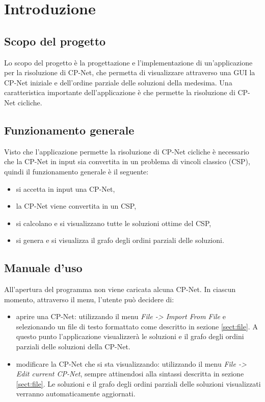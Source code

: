 \section{Introduzione}


\subsection{Scopo del progetto}
Lo scopo del progetto è la progettazione e l'implementazione di un'applicazione
per la risoluzione di CP-Net, che permetta di visualizzare
attraverso una GUI la CP-Net iniziale e dell'ordine parziale delle soluzioni della
medesima.
Una caratteristica importante dell'applicazione è che permette la risoluzione di
CP-Net cicliche.

\subsection{Funzionamento generale}
Visto che l'applicazione permette la risoluzione di CP-Net cicliche è
necessario che la CP-Net in input sia convertita in un problema di vincoli
classico (CSP), quindi il funzionamento generale è il seguente:
\begin{itemize}
  \item si accetta in input una CP-Net,
  \item la CP-Net viene convertita in un CSP,
  \item si calcolano e si visualizzano tutte le soluzioni ottime del CSP,
  \item si genera e si visualizza il grafo degli ordini parziali delle soluzioni.
\end{itemize}

\subsection{Manuale d'uso}

All'apertura del programma non viene caricata alcuna CP-Net.
In ciascun momento, attraverso il menu, l'utente può decidere di:
\begin{itemize}

\item aprire una CP-Net: utilizzando il menu \textit{File -> Import From File} e
selezionando un file di testo formattato come descritto in sezione 
\ref{sect:file}. A questo punto l'applicazione visualizzerà le soluzioni e il grafo degli ordini parziali delle soluzioni della CP-Net.

\item modificare la CP-Net che si sta visualizzando: utilizzando il menu
\textit{File -> Edit current CP-Net}, sempre attinendosi alla sintassi descritta
in sezione \ref{sect:file}. Le soluzioni e il grafo degli ordini parziali delle
soluzioni visualizzati verranno automaticamente aggiornati.

\end{itemize}

